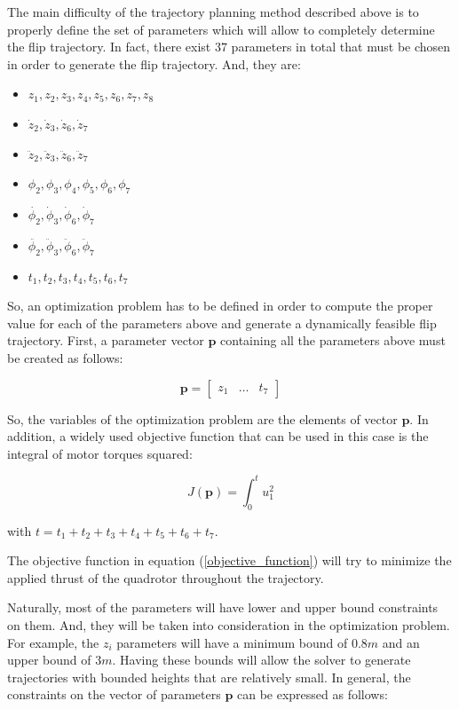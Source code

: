\documentclass{thesisreport}
\begin{document}
The main difficulty of the trajectory planning method described above is to properly define the set of parameters which will allow to completely determine the flip trajectory. In fact, there exist $37$ parameters in total that must be chosen in order to generate the flip trajectory. And, they are:

\begin{itemize}
	\item $z_1,z_2,z_3,z_4,z_5,z_6,z_7,z_8$
	\item $\dot{z}_2, \dot{z}_3, \dot{z}_6, \dot{z}_7$
	\item $\ddot{z}_2, \ddot{z}_3, \ddot{z}_6, \ddot{z}_7$
	\item $\phi_2, \phi_3, \phi_4, \phi_5, \phi_6, \phi_7$
	\item $\dot{\phi_2}, \dot{\phi}_3, \dot{\phi}_6, \dot{\phi}_7$
	\item $\ddot{\phi_2}, \ddot{\phi}_3, \ddot{\phi}_6, \ddot{\phi}_7$
	\item $t_1, t_2, t_3, t_4, t_5, t_6, t_7$
\end{itemize}

So, an optimization problem has to be defined in order to compute the proper value for each of the parameters above and generate a dynamically feasible flip trajectory. First, a parameter vector $\bm{p}$ containing all the parameters above must be created as follows: 

\begin{equation}
	\bm{p} = \begin{bmatrix}
	z_1 & \ldots & t_7
		\end{bmatrix}
\end{equation}

So, the variables of the optimization problem are the elements of vector $\bm{p}$. In addition, a widely used objective function that can be used in this case is the integral of motor torques squared: 

\begin{equation}\label{objective_function}
	J (\bm{p}) = \int_0^t u_1^2
\end{equation}

with $t = t_1 + t_2 + t_3 + t_4 + t_5 + t_6 + t_7$.

The objective function in equation (\ref{objective_function}) will try to minimize the applied thrust of the quadrotor throughout the trajectory.

Naturally, most of the parameters will have lower and upper bound constraints on them. And, they will be taken into consideration in the optimization problem. For example, the $z_i$ parameters will have a minimum bound of $0.8m$ and an upper bound of $3m$. Having these bounds will allow the solver to generate trajectories with bounded heights that are relatively small. In general, the constraints on the vector of parameters $\bm{p}$ can be expressed as follows: 
\end{document}
